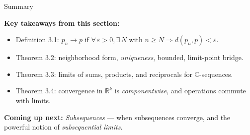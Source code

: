 \documentclass[aspectratio=169,12pt,t]{beamer}
\begin{document}
{%
\begin{frame}{Summary}
  \begin{hlbox}
    \textbf{Key takeaways from this section:}
    \begin{itemize}
      \item \alert{Definition 3.1}: $p_n \to p$ if $\forall\,\varepsilon > 0, \exists\, N$ with $n \geq N \Rightarrow d(p_n, p) < \varepsilon$.
      \item \alert{Theorem 3.2}: neighborhood form, \emph{uniqueness}, bounded, limit-point bridge.
      \item \alert{Theorem 3.3}: limits of sums, products, and reciprocals for $\mathbb{C}$-sequences.
      \item \alert{Theorem 3.4}: convergence in $\mathbb{R}^k$ is \emph{componentwise}, and operations commute with limits.
    \end{itemize}

    \vspace{0.6em}
    \textbf{Coming up next:} \emph{Subsequences} --- when subsequences converge, and
    the powerful notion of \emph{subsequential limits}.
  \end{hlbox}

\end{frame}
}
\end{document}
